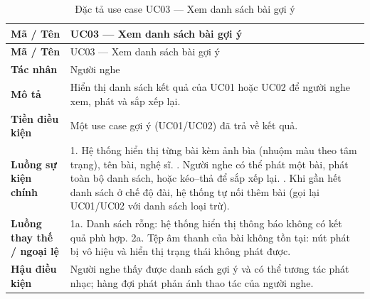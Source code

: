 \documentclass[../DoAn.tex]{subfiles}
\begin{document}
\begin{longtable}{|p{3.0cm}|p{11.0cm}|}
\caption{Đặc tả use case UC03 --- Xem danh sách bài gợi ý}\label{table:uc03}\\
\hline
\textbf{Mã / Tên} & UC03 --- Xem danh sách bài gợi ý \\
\hline
\endfirsthead
\hline
\textbf{Mã / Tên} & UC03 --- Xem danh sách bài gợi ý \\
\hline
\endhead
\textbf{Tác nhân} & Người nghe \\ \hline
\textbf{Mô tả} & Hiển thị danh sách kết quả của UC01 hoặc UC02 để người nghe xem, phát và sắp xếp lại. \\ \hline
\textbf{Tiền điều kiện} & Một use case gợi ý (UC01/UC02) đã trả về kết quả. \\ \hline
\textbf{Luồng sự kiện chính} & 1. Hệ thống hiển thị từng bài kèm ảnh bìa (nhuộm màu theo tâm trạng), tên bài, nghệ sĩ. \newline 2. Người nghe có thể phát một bài, phát toàn bộ danh sách, hoặc kéo--thả để sắp xếp lại. \newline 3. Khi gần hết danh sách ở chế độ đài, hệ thống tự nối thêm bài (gọi lại UC01/UC02 với danh sách loại trừ). \\ \hline
\textbf{Luồng thay thế / ngoại lệ} & 1a. Danh sách rỗng: hệ thống hiển thị thông báo không có kết quả phù hợp. \newline 2a. Tệp âm thanh của bài không tồn tại: nút phát bị vô hiệu và hiển thị trạng thái không phát được. \\ \hline
\textbf{Hậu điều kiện} & Người nghe thấy được danh sách gợi ý và có thể tương tác phát nhạc; hàng đợi phát phản ánh thao tác của người nghe. \\ \hline
\end{longtable}
\end{document}
